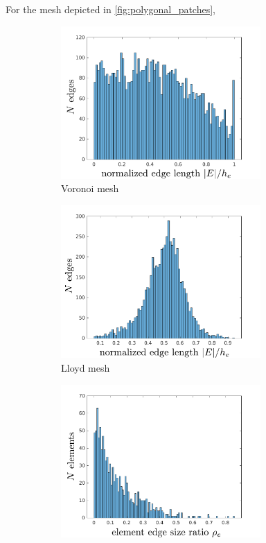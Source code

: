 For the mesh depicted in \ref{fig:polygonal_patches}, 
\begin{figure}[!h]
    \centering
    \begin{subfigure}[b]{0.49\linewidth}
            \centering
            \includegraphics[width=3.0in]{figures/patch_edge_lengths.pdf}
    			\caption{Voronoi mesh \label{fig:patch_edge_lengths}}
    \end{subfigure}
	\begin{subfigure}[b]{0.49\linewidth}
            \centering
            \includegraphics[width=3.0in]{figures/lloyd_edge_lengths.pdf}
    			\caption{Lloyd mesh \label{fig:lloyd_edge_lengths}}
    \end{subfigure}
    \begin{subfigure}[b]{0.49\linewidth}
            \centering
            \includegraphics[width=3.0in]{figures/patch_edge_ratios.pdf}

\end{subfigure}
\end{figure}
